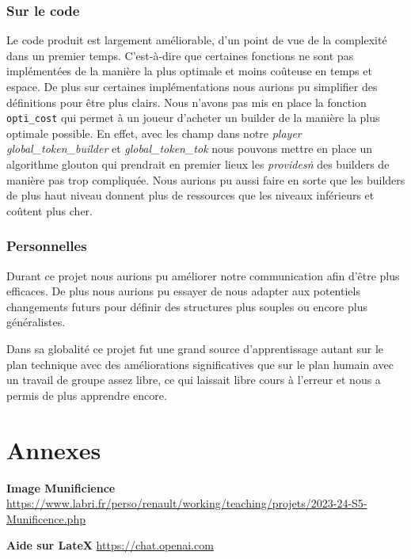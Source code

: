 \documentclass{article}
\begin{document}
\subsubsection{Sur le code}
\hspace{1em} Le code produit est largement améliorable, d'un point de vue de la complexité dans un premier temps. C'est-à-dire que certaines fonctions ne sont pas implémentées de la manière la plus optimale et moins coûteuse en temps et espace. De plus sur certaines implémentations nous aurions pu simplifier des définitions pour être plus clairs. 
Nous n'avons pas mis en place la fonction \texttt{opti\_cost} qui permet à un joueur d'acheter un builder de la manière la plus optimale possible. En effet, avec les champ dans notre \emph{player} \emph{global\_token\_builder} et \emph{global\_token\_tok} nous pouvons mettre en place un algorithme glouton qui prendrait en premier lieux les \emph{provides\.n} des builders de manière pas trop compliquée. Nous aurions pu aussi faire en sorte que les builders de plus haut niveau donnent plus de ressources que les niveaux inférieurs et coûtent plus cher.

\subsubsection{Personnelles}
\hspace{1em} Durant ce projet nous aurions pu améliorer notre communication afin d'être plus efficaces. De plus nous aurions pu essayer de nous adapter aux potentiels changements futurs pour définir des structures plus souples ou encore plus généralistes. 

\vspace{1em}
\hspace{1em} Dans sa globalité ce projet fut une grand source d'apprentissage autant sur le plan technique avec des améliorations significatives que sur le plan humain avec un travail de groupe assez libre, ce qui laissait libre cours à l'erreur et nous a permis de plus apprendre encore.   
\section{Annexes}

\noindent [Labri.fr] \textbf{Image Munificience} 
\href{https://www.labri.fr/perso/renault/working/teaching/projets/2023-24-S5-Munificence.php}{https://www.labri.fr/perso/renault/working/teaching/projets/2023-24-S5-Munificence.php}

\noindent [ChatGPT] \textbf{Aide sur LateX}
\href{https://chat.openai.com}{https://chat.openai.com}
\end{document}
